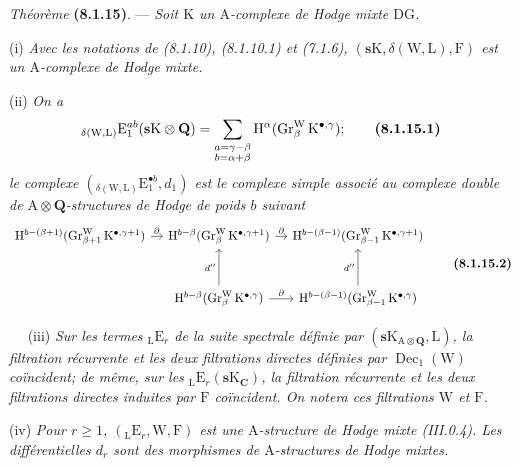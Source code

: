 \documentclass[11pt,leqno]{article}
\newcommand{\Page}[1]{\ifvmode\noindent\else\unskip\ \fi{\footnotesize\textcolor{gray}{[p.\,#1]}}\ \ignorespaces}
\begin{document}
\textit{Théorème} \textbf{(8.1.15)}. — \textit{Soit \(\mathrm{K}\) un \(\mathrm{A}\)-complexe de Hodge mixte \(\mathrm{DG}\).}

(i) \textit{Avec les notations de (8.1.10), (8.1.10.1) et (7.1.6), \((\mathbf{s}\mathrm{K},\delta(\mathrm{W},\mathrm{L}),\mathrm{F})\) est un \(\mathrm{A}\)-complexe de Hodge mixte.}

(ii) \textit{On a}
\[
{}_{\delta(\mathrm{W},\mathrm{L})}\mathrm{E}_{1}^{ab}
(\mathbf{s}\mathrm{K}\otimes\mathbf{Q})
=
\sum_{\substack{a=\gamma-\beta\\b=\alpha+\beta}}
\mathrm{H}^{\alpha}
(\operatorname{Gr}_{\beta}^{\mathrm{W}}\mathrm{K}^{\bullet,\gamma});
\tag*{\textbf{(8.1.15.1)}}
\]
\textit{le complexe \(({}_{\delta(\mathrm{W},\mathrm{L})}\mathrm{E}_{1}^{\bullet b},d_{1})\) est le complexe simple associé au complexe double de \(\mathrm{A}\otimes\mathbf{Q}\)-structures de Hodge de poids \(b\) suivant}
\[
\begin{tikzcd}[ampersand replacement=\&, column sep=1em, row sep=3em]
\mathrm{H}^{b-(\beta+1)}
(\operatorname{Gr}_{\beta+1}^{\mathrm{W}}\mathrm{K}^{\bullet,\gamma+1})
\arrow[r, "\partial"]
\&
\mathrm{H}^{b-\beta}
(\operatorname{Gr}_{\beta}^{\mathrm{W}}\mathrm{K}^{\bullet,\gamma+1})
\arrow[r, "\partial"]
\&
\mathrm{H}^{b-(\beta-1)}
(\operatorname{Gr}_{\beta-1}^{\mathrm{W}}\mathrm{K}^{\bullet,\gamma+1})
\\
\&
\mathrm{H}^{b-\beta}
(\operatorname{Gr}_{\beta}^{\mathrm{W}}\mathrm{K}^{\bullet,\gamma})
\arrow[u, "d''"]
\arrow[r, "\partial"]
\&
\mathrm{H}^{b-(\beta-1)}
(\operatorname{Gr}_{\beta-1}^{\mathrm{W}}\mathrm{K}^{\bullet,\gamma})
\arrow[u, "d''"]
\end{tikzcd}
\tag*{\textbf{(8.1.15.2)}}
\]

\Page{33}
(iii) \textit{Sur les termes \({}_{\mathrm{L}}\mathrm{E}_{r}\) de la suite spectrale définie par \((\mathbf{s}\mathrm{K}_{\mathrm{A}\otimes\mathbf{Q}},\mathrm{L})\), la filtration récurrente et les deux filtrations directes définies par \(\operatorname{Dec}_{1}(\mathrm{W})\) coïncident; de même, sur les \({}_{\mathrm{L}}\mathrm{E}_{r}(\mathbf{s}\mathrm{K}_{\mathbf{C}})\), la filtration récurrente et les deux filtrations directes induites par \(\mathrm{F}\) coïncident. On notera ces filtrations \(\mathrm{W}\) et \(\mathrm{F}\).}

(iv) \textit{Pour \(r\geq1\), \(({}_{\mathrm{L}}\mathrm{E}_{r},\mathrm{W},\mathrm{F})\) est une \(\mathrm{A}\)-structure de Hodge mixte (III.0.4). Les différentielles \(d_{r}\) sont des morphismes de \(\mathrm{A}\)-structures de Hodge mixtes.}
\end{document}
